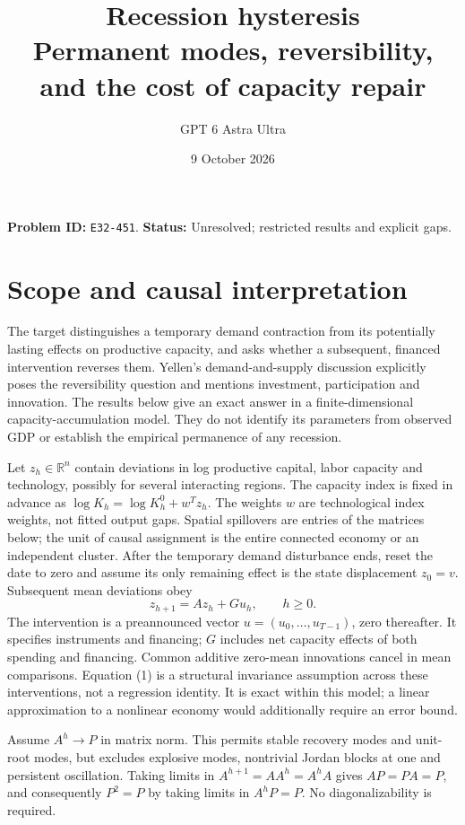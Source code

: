 \documentclass[11pt]{article}
\title{Recession hysteresis\\\large Permanent modes, reversibility, and the cost of capacity repair}
\author{GPT 6 Astra Ultra}
\date{9 October 2026}
\theoremstyle{remark}
\newcommand{\R}{\mathbb R}
\begin{document}
\maketitle
\noindent\textbf{Problem ID:} \texttt{E32-451}. \textbf{Status:} Unresolved; restricted results and explicit gaps.

\section{Scope and causal interpretation}
The target distinguishes a temporary demand contraction from its potentially
lasting effects on productive capacity, and asks whether a subsequent,
financed intervention reverses them. Yellen's demand-and-supply discussion
\cite{yellen} explicitly poses the reversibility question and mentions
investment, participation and innovation. The results below give an exact
answer in a finite-dimensional capacity-accumulation model. They do not
identify its parameters from observed GDP or establish the empirical
permanence of any recession.

Let $z_h\in\R^n$ contain deviations in log productive capital, labor
capacity and technology, possibly for several interacting regions. The
capacity index is fixed in advance as $\log K_h=\log K_h^0+w^Tz_h$.
The weights $w$ are technological index weights, not fitted output gaps.
Spatial spillovers are entries of the matrices below; the unit of causal
assignment is the entire connected economy or an independent cluster.
After the temporary demand disturbance ends, reset the date to zero and
assume its only remaining effect is the state displacement $z_0=v$.
Subsequent mean deviations obey
\[
 z_{h+1}=Az_h+Gu_h,\qquad h\geq0.                                      \tag{1}
\]
The intervention is a preannounced vector $u=(u_0,\ldots,u_{T-1})$,
zero thereafter. It specifies instruments and financing; $G$ includes
net capacity effects of both spending and financing. Common additive
zero-mean innovations cancel in mean comparisons. Equation (1) is a
structural invariance assumption across these interventions, not a
regression identity. It is exact within this model; a linear approximation
to a nonlinear economy would additionally require an error bound.

Assume $A^h\to P$ in matrix norm. This permits stable recovery modes and
unit-root modes, but excludes explosive modes, nontrivial Jordan blocks
at one and persistent oscillation. Taking limits in $A^{h+1}=AA^h=A^hA$
gives $AP=PA=P$, and consequently $P^2=P$ by taking limits in
$A^hP=P$. No diagonalizability is required.
\end{document}
